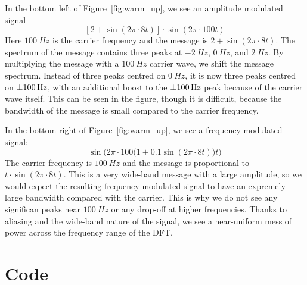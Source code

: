 \documentclass[twocolumn]{myarticle}
\begin{document}
In the bottom left of Figure~\ref{fig:warm_up}, we see an amplitude modulated signal
\[
    \left[ 2 + \sin(2\pi \cdot 8 t) \right] \cdot \sin ( 2 \pi \cdot 100 t)
\]
Here $ \SI{100}{Hz} $ is the carrier frequency and the message is $ 2 + \sin(2 \pi \cdot 8 t) $.
The spectrum of the message contains three peaks at $ \SI{-2}{Hz} $, $ \SI{0}{Hz} $, and $ \SI{2}{Hz} $.
By multiplying the message with a $ \SI{100}{Hz} $ carrier wave, we shift the message spectrum.
Instead of three peaks centred on $ \SI{0}{Hz} $, it is now three peaks centred on $ \SI{+-100}{Hz} $, with an additional boost to the $ \SI{+-100}{Hz} $ peak because of the carrier wave itself.
This can be seen in the figure, though it is difficult, because the bandwidth of the message is small compared to the carrier frequency.

In the bottom right of Figure~\ref{fig:warm_up}, we see a frequency modulated signal:
\[
    \sin \Big( 2 \pi \cdot 100 \big( 1 + 0.1 \sin (2 \pi \cdot 8 t) \big) t \Big)
\]
The carrier frequency is $ \SI{100}{Hz} $ and the message is proportional to $ t \cdot \sin(2 \pi \cdot 8 t) $.
This is a very wide-band message with a large amplitude, so we would expect the resulting frequency-modulated signal to have an expremely large bandwidth compared with the carrier.
This is why we do not see any significan peaks near $ \SI{100}{Hz} $ or any drop-off at higher frequencies.
Thanks to aliasing and the wide-band nature of the signal, we see a near-uniform mess of power across the frequency range of the DFT.


\section{Code}
\label{sec:code}

%
\end{document}

